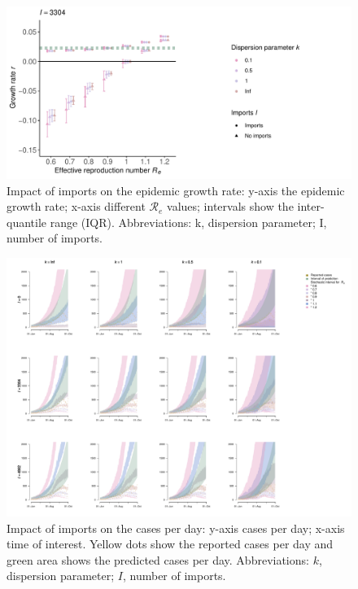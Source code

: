\documentclass[10pt, a4paper, twoside]{article}
\begin{document}
\begin{multicols}{2}

\end{multicols}
\begin{figure}[h]
\centering
\includegraphics[scale=0.5]{growth_r_imports_infect_reported_2021-02-24.pdf}
\caption{Impact of imports on the epidemic growth rate: y-axis the epidemic growth rate; x-axis different $\mathcal{R}_e$ values; intervals show the inter-quantile range (IQR). Abbreviations: k, dispersion parameter; I, number of imports.}
\end{figure}
\begin{multicols}{2}

\end{multicols}
\begin{figure}[h]
\centering
\includegraphics[scale=0.4]{sim3_cases_d_imports_infect_2021-02-24.pdf}
\caption{Impact of imports on the cases per day: y-axis cases per day; x-axis time of interest. Yellow dots show the reported cases per day and green area shows the predicted cases per day. Abbreviations: $k$, dispersion parameter; $I$, number of imports.}
\end{figure}
\end{document}
